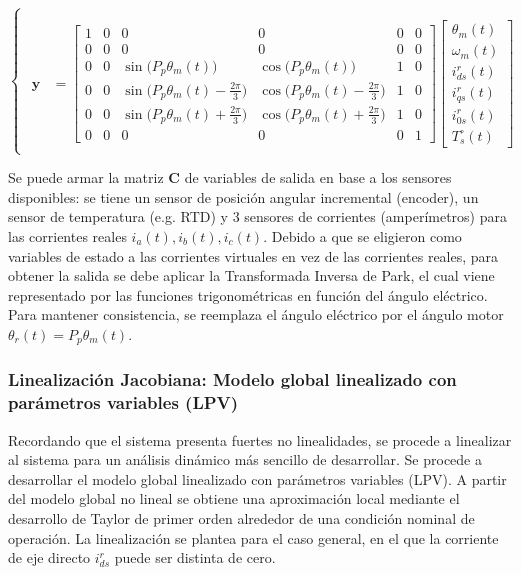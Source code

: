 \documentclass[blue,fullpaper]{ludusofficial}  %
\begin{document}
\begin{equation}
\begin{cases}
\begin{aligned}
 \\
\mathbf{y}  & = \begin{bmatrix}
1 & 0 & 0 & 0 & 0 & 0 \\
0 & 0 & 0 & 0 & 0 & 0 \\
0 & 0 &  \sin \big( P_{p}\theta_{m}(t) \big) & \cos \big( P_{p}\theta_{m}(t) \big)  & 1 & 0 \\
0 & 0 & \sin \big( P_{p}\theta_{m}(t) - \frac{2\pi}{3} \big) & \cos \big( P_{p}\theta_{m}(t) - \frac{2\pi}{3} \big) & 1 & 0 \\
0 & 0  & \sin \big( P_{p}\theta_{m}(t) + \frac{2\pi}{3} \big) & \cos \big( P_{p}\theta_{m}(t) + \frac{2\pi}{3} \big) & 1 & 0  \\
0 & 0 & 0 & 0 & 0 & 1
\end{bmatrix} \begin{bmatrix} \theta_{m}(t) \\ \omega_{m}(t) \\ i_{ds}^{r}(t) \\ i_{qs}^{r}(t) \\ i_{0s}^{r}(t) \\ T_{s}^{\circ}(t) \end{bmatrix}
\end{aligned}
\end{cases}
\end{equation}

Se puede armar la matriz $\mathbf{C}$ de variables de salida en base a los sensores disponibles: se tiene un sensor de posición angular incremental (encoder), un sensor de temperatura (e.g. RTD) y 3 sensores de corrientes (amperímetros) para las corrientes reales $i_{a}(t), i_{b}(t), i_{c}(t)$. Debido a que se eligieron como variables de estado a las corrientes virtuales en vez de las corrientes reales, para obtener la salida se debe aplicar la Transformada Inversa de Park, el cual viene representado por las funciones trigonométricas en función del ángulo eléctrico. Para mantener consistencia, se reemplaza el ángulo eléctrico por el ángulo motor $\theta_{r}(t) = P_{p} \theta_{m}(t)$.

\subsubsection{Linealización Jacobiana: Modelo global linealizado con parámetros variables (LPV)}
Recordando que el sistema presenta fuertes no linealidades, se procede a linealizar al sistema para un análisis dinámico más sencillo de desarrollar. Se procede a desarrollar el modelo global linealizado con parámetros variables (LPV). A partir del modelo global no lineal se obtiene una aproximación local
mediante el desarrollo de Taylor de primer orden alrededor de una
condición nominal de operación. La linealización se plantea para el
caso general, en el que la corriente de eje directo $i_{ds}^{r}$
puede ser distinta de cero.
\end{document}
